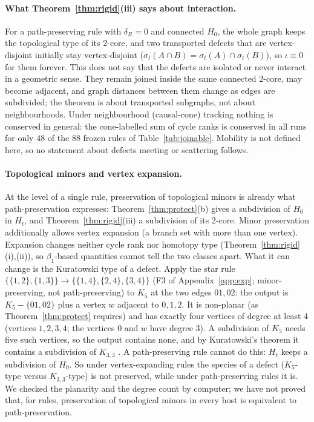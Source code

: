 \documentclass[10pt]{article}
\theoremstyle{definition}
\theoremstyle{plain}
\theoremstyle{remark}
\newcommand{\Betti}{\beta_1}
\begin{document}
\paragraph{What Theorem~\ref{thm:rigid}(iii) says about interaction.} For a path-preserving rule with $\delta_R=0$ and connected $H_0$, the whole graph keeps the topological type of its 2-core, and two transported defects that are vertex-disjoint initially stay vertex-disjoint ($\sigma_t(A\cap B)=\sigma_t(A)\cap\sigma_t(B)$), so $\iota\equiv0$ for them forever. This does not say that the defects are isolated or never interact in a geometric sense. They remain joined inside the same connected 2-core, may become adjacent, and graph distances between them change as edges are subdivided; the theorem is about transported subgraphs, not about neighbourhoods. Under neighbourhood (causal-cone) tracking nothing is conserved in general: the cone-labelled sum of cycle ranks is conserved in all runs for only $48$ of the $88$ frozen rules of Table~\ref{tab:joinable}. Mobility is not defined here, so no statement about defects meeting or scattering follows.

\paragraph{Topological minors and vertex expansion.} At the level of a single rule, preservation of topological minors is already what path-preservation expresses: Theorem~\ref{thm:protect}(b) gives a subdivision of $H_0$ in $H_t$, and Theorem~\ref{thm:rigid}(iii) a subdivision of its 2-core. Minor preservation additionally allows vertex expansion (a branch set with more than one vertex). Expansion changes neither cycle rank nor homotopy type (Theorem~\ref{thm:rigid}(i),(ii)), so $\Betti$-based quantities cannot tell the two classes apart. What it can change is the Kuratowski type of a defect. Apply the star rule $\{\{1,2\},\{1,3\}\}\to\{\{1,4\},\{2,4\},\{3,4\}\}$ (F3 of Appendix~\ref{app:exp}; minor-preserving, not path-preserving) to $K_5$ at the two edges $01,02$: the output is $K_5-\{01,02\}$ plus a vertex $w$ adjacent to $0,1,2$. It is non-planar (as Theorem~\ref{thm:protect} requires) and has exactly four vertices of degree at least $4$ (vertices $1,2,3,4$; the vertices $0$ and $w$ have degree $3$). A subdivision of $K_5$ needs five such vertices, so the output contains none, and by Kuratowski's theorem it contains a subdivision of $K_{3,3}$ \citep{diestel2017}. A path-preserving rule cannot do this: $H_t$ keeps a subdivision of $H_0$. So under vertex-expanding rules the species of a defect ($K_5$-type versus $K_{3,3}$-type) is not preserved, while under path-preserving rules it is. We checked the planarity and the degree count by computer; we have not proved that, for rules, preservation of topological minors in every host is equivalent to path-preservation.
\end{document}
